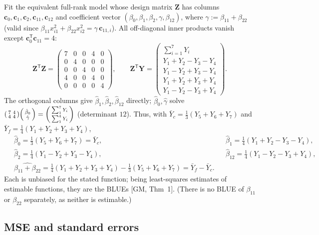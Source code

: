 \documentclass[11pt]{article}
\newcommand{\bY}{\mathbf{Y}}
\newcommand{\bZ}{\mathbf{Z}}
\newcommand{\bc}{\mathbf{c}}
\newcommand{\T}{^{\mathsf{T}}}
\theoremstyle{remark}
\begin{document}
Fit the equivalent full-rank model whose design matrix $\bZ$ has columns
$\bc_0,\bc_1,\bc_2,\bc_{11},\bc_{12}$ and coefficient vector
$(\beta_0,\beta_1,\beta_2,\gamma,\beta_{12})$, where $\gamma:=\beta_{11}+\beta_{22}$ (valid since
$\beta_{11}x_{i1}^2+\beta_{22}x_{i2}^2=\gamma\,\bc_{11,i}$). All off-diagonal inner products vanish except
$\bc_0\T\bc_{11}=4$:
\[
\bZ\T\bZ=\begin{pmatrix}7&0&0&4&0\\0&4&0&0&0\\0&0&4&0&0\\4&0&0&4&0\\0&0&0&0&4\end{pmatrix},\qquad
\bZ\T\bY=\begin{pmatrix}\sum_{i=1}^{7}Y_i\\ Y_1+Y_2-Y_3-Y_4\\ Y_1-Y_2+Y_3-Y_4\\
Y_1+Y_2+Y_3+Y_4\\ Y_1-Y_2-Y_3+Y_4\end{pmatrix}.
\]
The orthogonal columns give $\hat\beta_1,\hat\beta_2,\hat\beta_{12}$ directly; $\hat\beta_0,\hat\gamma$ solve
$\begin{psmallmatrix}7&4\\4&4\end{psmallmatrix}
\begin{psmallmatrix}\hat\beta_0\\\hat\gamma\end{psmallmatrix}
=\begin{psmallmatrix}\sum_1^7 Y_i\\ \sum_1^4 Y_i\end{psmallmatrix}$ (determinant $12$). Thus, with
$\bar Y_c=\tfrac13(Y_5+Y_6+Y_7)$ and $\bar Y_f=\tfrac14(Y_1+Y_2+Y_3+Y_4)$,
\[
\boxed{\
\begin{aligned}
&\hat\beta_0=\tfrac13(Y_5+Y_6+Y_7)=\bar Y_c, &&\hat\beta_1=\tfrac14(Y_1+Y_2-Y_3-Y_4),\\
&\hat\beta_2=\tfrac14(Y_1-Y_2+Y_3-Y_4), &&\hat\beta_{12}=\tfrac14(Y_1-Y_2-Y_3+Y_4),\\
&\widehat{\beta_{11}+\beta_{22}}=\tfrac14(Y_1+Y_2+Y_3+Y_4)-\tfrac13(Y_5+Y_6+Y_7)=\bar Y_f-\bar Y_c.
\end{aligned}\ }
\]
Each is unbiased for the stated function; being least-squares estimates of estimable functions, they are the
BLUEs [GM, Thm~1]. (There is no BLUE of $\beta_{11}$ or $\beta_{22}$ separately, as neither is estimable.)

\subsection*{MSE and standard errors}
\end{document}
